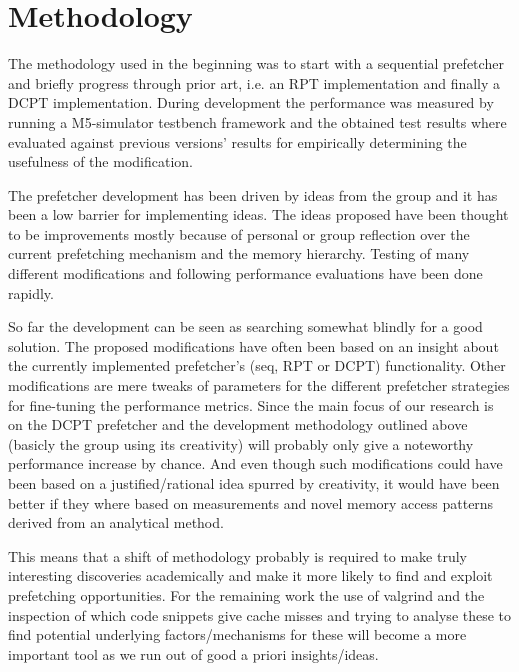 \chapter{Methodology}

The methodology used in the beginning was to start with a sequential
prefetcher and briefly progress through prior art, i.e. an RPT implementation
and finally a DCPT implementation. During development the performance was
measured by running a M5-simulator testbench framework and the obtained test
results where evaluated against previous versions' results for
empirically determining the usefulness of the modification.

The prefetcher development has been driven by ideas from the group and it
has been a low barrier for implementing ideas. The ideas proposed have been
thought to be improvements mostly because of personal or group reflection over
the current prefetching mechanism and the memory hierarchy. Testing of
many different modifications and following performance evaluations have been
done rapidly.

So far the development can be seen as searching somewhat blindly for a good
solution. The proposed modifications have often been based on an insight
about the currently implemented prefetcher's (seq, RPT or DCPT) functionality.
Other modifications are mere tweaks of parameters for the different prefetcher
strategies for fine-tuning the performance metrics. Since the main focus of
our research is on the DCPT prefetcher and the development methodology
outlined above (basicly the group using its creativity) will probably only
give a noteworthy performance increase by chance. And even though such
modifications could have been based on a justified/rational idea spurred by
creativity, it would have been better if they where based on measurements and
novel memory access patterns derived from an analytical method.

This means that a shift of methodology probably is required to make truly
interesting discoveries academically and make it more likely to find and
exploit prefetching opportunities. For the remaining work the use of valgrind
and the inspection of which code snippets give cache misses and trying to
analyse these to find potential underlying factors/mechanisms for these
will become a more important tool as we run out of good a priori
insights/ideas.
